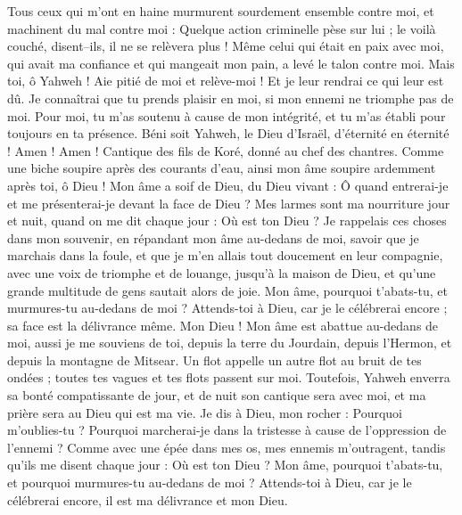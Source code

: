 \begin{multicols}{2}
Tous ceux qui m'ont en haine murmurent sourdement ensemble contre moi, et machinent du mal contre moi :
Quelque action criminelle pèse sur lui ; le voilà couché, disent–ils, il ne se relèvera plus !
Même celui qui était en paix avec moi, qui avait ma confiance et qui mangeait mon pain, a levé le talon contre moi.
Mais toi, ô Yahweh ! Aie pitié de moi et relève-moi ! Et je leur rendrai ce qui leur est dû.
Je connaîtrai que tu prends plaisir en moi, si mon ennemi ne triomphe pas de moi.
Pour moi, tu m'as soutenu à cause de mon intégrité, et tu m'as établi pour toujours en ta présence.
Béni soit Yahweh, le Dieu d'Israël, d'éternité en éternité ! Amen ! Amen !
\VerseOne{}Cantique des fils de Koré, donné au chef des chantres.
Comme une biche soupire après des courants d'eau, ainsi mon âme soupire ardemment après toi, ô Dieu !
Mon âme a soif de Dieu, du Dieu vivant : Ô quand entrerai-je et me présenterai-je devant la face de Dieu ?
Mes larmes sont ma nourriture jour et nuit, quand on me dit chaque jour : Où est ton Dieu ?
Je rappelais ces choses dans mon souvenir, en répandant mon âme au-dedans de moi, savoir que je marchais dans la foule, et que je m'en allais tout doucement en leur compagnie, avec une voix de triomphe et de louange, jusqu'à la maison de Dieu, et qu'une grande multitude de gens sautait alors de joie.
Mon âme, pourquoi t'abats-tu, et murmures-tu au-dedans de moi ? Attends-toi à Dieu, car je le célébrerai encore ; sa face est la délivrance même.
Mon Dieu ! Mon âme est abattue au-dedans de moi, aussi je me souviens de toi, depuis la terre du Jourdain, depuis l'Hermon, et depuis la montagne de Mitsear.
Un flot appelle un autre flot au bruit de tes ondées ; toutes tes vagues et tes flots passent sur moi.
Toutefois, Yahweh enverra sa bonté compatissante de jour, et de nuit son cantique sera avec moi, et ma prière sera au Dieu qui est ma vie.
Je dis à Dieu, mon rocher : Pourquoi m'oublies-tu ? Pourquoi marcherai-je dans la tristesse à cause de l'oppression de l'ennemi ?
Comme avec une épée dans mes os, mes ennemis m'outragent, tandis qu'ils me disent chaque jour : Où est ton Dieu ?
Mon âme, pourquoi t'abats-tu, et pourquoi murmures-tu au-dedans de moi ? Attends-toi à Dieu, car je le célébrerai encore, il est ma délivrance et mon Dieu.

\end{multicols}
